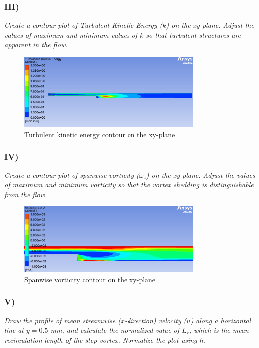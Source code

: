 \subsubsection{III)}
\textit{Create a contour plot of Turbulent Kinetic Energy ($k$) on the xy-plane. Adjust the values of maximum and minimum values of $k$ so that turbulent structures are apparent in the flow.}
\begin{figure}[H]
    \centering
    \includegraphics[width=0.8\textwidth]{Questions/Figures/tke contour.png}
    \caption{Turbulent kinetic energy contour on the xy-plane}
\end{figure}

\subsubsection{IV)}
\textit{Create a contour plot of spanwise vorticity ($\omega_z$) on the xy-plane. Adjust the values of maximum and minimum vorticity so that the vortex shedding is distinguishable from the flow.}
\begin{figure}[H]
    \centering
    \includegraphics[width=0.8\textwidth]{Questions/Figures/vorticity contour.png}
    \caption{Spanwise vorticity contour on the xy-plane}
\end{figure}

\subsubsection{V)}
\textit{Draw the profile of mean streamwise ($x$-direction) velocity ($u$) along a horizontal line at $y = 0.5$ mm, and calculate the normalized value of $L_r$, which is the mean recirculation length of the step vortex. Normalize the plot using $h$.}

